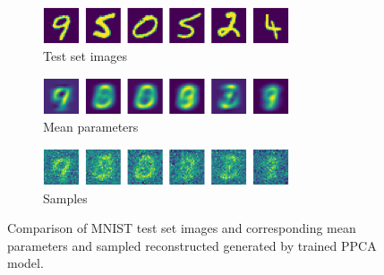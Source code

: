 \begin{figure}[H]
	\begin{subfigure}[t]{1\textwidth}
		\centering
		\includegraphics[width = 0.8\textwidth]{figures/ppca/real}
		\caption{Test set images}
		\label{fig:ppca:real}
	\end{subfigure}
	\begin{subfigure}[t]{1\textwidth}
		\centering
		\includegraphics[width = 0.8\textwidth]{figures/ppca/mean}
		\caption{Mean parameters}
		\label{fig:ppca:mean}
	\end{subfigure}
	\begin{subfigure}[t]{1\textwidth}
		\centering
		\includegraphics[width = 0.8\textwidth]{figures/ppca/sample}
		\caption{Samples}
		\label{fig:ppca:sample}
	\end{subfigure}
	\caption{Comparison of MNIST test set images and corresponding mean parameters and sampled reconstructed generated by trained PPCA model.}
	\label{fig:ppca:_v_real}
\end{figure}


